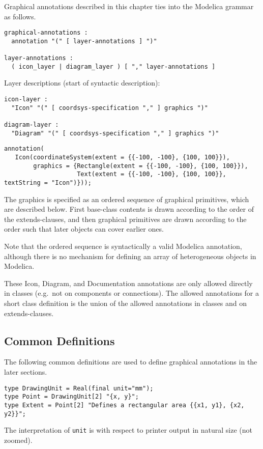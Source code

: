 Graphical annotations described in this chapter ties into the Modelica
grammar as follows.
\begin{lstlisting}[language=grammar]
graphical-annotations :
  annotation "(" [ layer-annotations ] ")"

layer-annotations :
  ( icon_layer | diagram_layer ) [ "," layer-annotations ]
\end{lstlisting}
Layer descriptions (start of syntactic description):
\begin{lstlisting}[language=grammar]
icon-layer :
  "Icon" "(" [ coordsys-specification "," ] graphics ")"

diagram-layer :
  "Diagram" "(" [ coordsys-specification "," ] graphics ")"
\end{lstlisting}

\begin{example}
\begin{lstlisting}[language=modelica]
annotation(
   Icon(coordinateSystem(extent = {{-100, -100}, {100, 100}}),
        graphics = {Rectangle(extent = {{-100, -100}, {100, 100}}),
                    Text(extent = {{-100, -100}, {100, 100}}, textString = "Icon")}));
\end{lstlisting}
\end{example}

The graphics is specified as an ordered sequence of graphical
primitives, which are described below. First base-class contents is
drawn according to the order of the extends-clauses, and then graphical
primitives are drawn according to the order such that later objects can
cover earlier ones.

\begin{nonnormative}
Note that the ordered sequence is syntactically a valid Modelica annotation, although there
is no mechanism for defining an array of heterogeneous objects in Modelica.
\end{nonnormative}

These Icon, Diagram, and Documentation annotations are only allowed
directly in classes (e.g.\ not on components or connections). The allowed
annotations for a short class definition is the union of the allowed
annotations in classes and on extends-clauses.

\subsection{Common Definitions}\label{common-definitions}

The following common definitions are used to define graphical
annotations in the later sections.
\begin{lstlisting}[language=modelica]
type DrawingUnit = Real(final unit="mm");
type Point = DrawingUnit[2] "{x, y}";
type Extent = Point[2] "Defines a rectangular area {{x1, y1}, {x2, y2}}";
\end{lstlisting}
The interpretation of \lstinline!unit! is with respect to printer output in
natural size (not zoomed).


